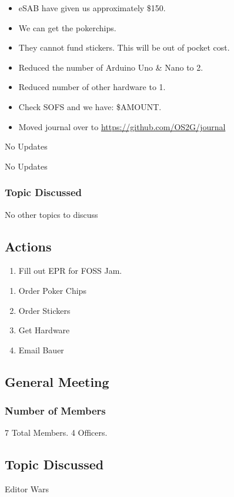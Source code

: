 \begin{itemize}
    \item eSAB have given us approximately \$150. 
    \item We can get the pokerchips.
    \item They cannot fund stickers. This will be out of pocket cost.
    \item Reduced the number of Arduino Uno \& Nano to 2.
    \item Reduced number of other hardware to 1.
    \item Check SOFS and we have: \$AMOUNT.
    \item Moved journal over to \href{https://github.com/OS2G/journal}{https://github.com/OS2G/journal}
\end{itemize}

\textbf{\primaryprogrammer}

No Updates

\textbf{\secretary}

No Updates

\subsubsection{Topic Discussed}

No other topics to discuss

\subsection{Actions}

\textbf{\primaryprogrammer}

\begin{enumerate}
    \item Fill out EPR for FOSS Jam.
\end{enumerate}

\textbf{\tresurer}

\begin{enumerate}
    \item Order Poker Chips
    \item Order Stickers
    \item Get Hardware
    \item Email Bauer
\end{enumerate}

\subsection{General Meeting}
\subsubsection{Number of Members} 

7 Total Members. 4 Officers.

\subsection{Topic Discussed}
Editor Wars
